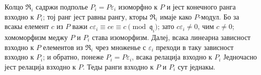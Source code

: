 \documentclass[11pt]{article}
\begin{document}
Колцо $\mathfrak R_i$ садржи подполье $P_i=P\varepsilon_i$ изоморфно к $P$ и јест конечного ранга взходно к $P_i$; тој ранг јест равны рангу, кторы $\mathfrak R_i$ имаје како $P$-модул. Бо за всакы елемент $c$ из $P$ важи $c\varepsilon_i\equiv ce\equiv c\pmod{\mathfrak q_i}$; зато $c\varepsilon_i\ne 0$, чим $c\ne0$; хомоморфизм меджу $P$ и $P_i$ става изоморфизм. Далеј, всака линеарна зависност взходно к $P$ елементов из $\mathfrak R_i$ чрез множенье с $\varepsilon_i$ преходи в таку зависност взходно к $P_i$; и обратно, понеже $P_i=P\varepsilon_i$, всака релација взходно к $P_i$ Једночасно јест релација взходно к $P$. Теды ранги взходно к $P$ и $P_i$ сут једнакы.
\end{document}
